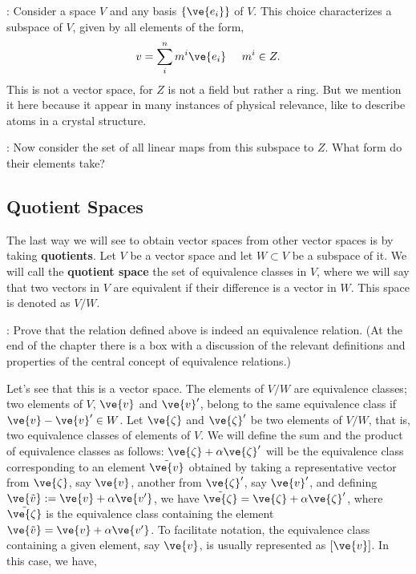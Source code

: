 \ejem: Consider a space $V$ and any basis $\{\ve{e_{i}}\}$ of $V$. This choice characterizes a subspace of $V$, given by all elements of the form, 
\[ 
v=\sum_{i}^{n} m^{i}\ve{e_{i}} \;\;\;\;\; m^{i} \in Z. 
\]
This is not a vector space, for $Z$ is not a field but rather a ring. But we mention it here because it appear 
in many instances of physical relevance, like to describe atoms in a crystal structure.

\ejer: Now consider the set of all linear maps from this subspace to $Z$. What form do their elements take?

\subsection{Quotient Spaces}

The last way we will see to obtain vector spaces from other vector spaces is by taking \textbf{quotients}. Let $V$ be a vector space and let $W \subset V$ be a subspace of it. We will call the \textbf{quotient space} the set of equivalence classes in $V$, where we will say that two vectors in $V$ are equivalent if their difference is a vector in $W$. This space is denoted as $V/W$.

\ejer: Prove that the relation defined above is indeed an equivalence relation. (At the end of the chapter there is a box with a discussion of the relevant definitions and properties of the central concept of equivalence relations.)

Let's see that this is a vector space. 
The elements of $V/W$ are equivalence classes; two elements of $V$, $\ve{v}$ and $\ve{v}'$, belong to the same equivalence class if 
$\ve{v}-\ve{v}' \in W$. 
Let $\ve{\zeta}$ and $\ve{\zeta}'$ be two elements of $V/W$, that is, two equivalence classes of elements of $V$. 
We will define the sum and the product of equivalence classes as follows: $\ve{\zeta} + \alpha \ve{\zeta}'$ will be the equivalence class 
corresponding to an element $\tilde{\ve{v}}$ obtained by taking a representative vector from $\ve{\zeta}$, say $\ve{v}$, another from 
$\ve{\zeta}'$, say $\ve{v}'$, and defining $\ve{\tilde{v}} := \ve{v} + \alpha \ve{v'}$, we have 
$\tilde{\ve{\zeta}}= \ve{\zeta} + \alpha \ve{\zeta}'$, where $\tilde{\ve{\zeta}}$ is the equivalence class containing the element 
$\ve{\tilde{v}} = \ve{v} + \alpha \ve{v'}$. 
To facilitate notation, the equivalence class containing a given element, say $\ve{v}$, is usually represented as $[ \ve{v} ]$. In this case, we have,

